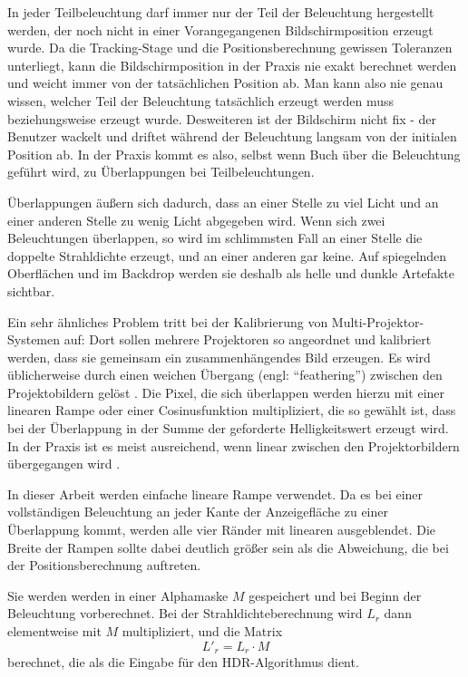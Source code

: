    In jeder Teilbeleuchtung  darf immer nur der Teil der Beleuchtung hergestellt werden, der noch nicht in einer Vorangegangenen Bildschirmposition erzeugt wurde.
   Da die Tracking-Stage und die Positionsberechnung gewissen Toleranzen unterliegt, kann die Bildschirmposition in der Praxis nie exakt berechnet werden und weicht immer von der tatsächlichen Position ab.
   Man kann also nie genau wissen, welcher Teil der Beleuchtung tatsächlich erzeugt werden muss beziehungsweise erzeugt wurde.
   Desweiteren ist der Bildschirm nicht fix - der Benutzer wackelt und driftet während der Beleuchtung langsam von der initialen Position ab. 
   In der Praxis kommt es also, selbst wenn Buch über die Beleuchtung geführt wird, zu Überlappungen bei Teilbeleuchtungen.
   
   Überlappungen äußern sich dadurch, dass an einer Stelle zu viel Licht und an einer anderen Stelle zu wenig Licht abgegeben wird.   
   Wenn sich zwei Beleuchtungen überlappen, so wird im schlimmsten Fall an einer Stelle die doppelte Strahldichte erzeugt, und an einer anderen gar keine. 
   Auf spiegelnden Oberflächen und im Backdrop werden sie deshalb als helle und dunkle Artefakte sichtbar.

   Ein sehr ähnliches Problem tritt bei der Kalibrierung von Multi-Projektor-Systemen auf: Dort sollen mehrere Projektoren so angeordnet und kalibriert werden, dass sie gemeinsam ein zusammenhängendes Bild erzeugen.
   Es wird üblicherweise durch einen weichen Übergang (engl: ``feathering'') zwischen den Projektobildern gelöst \cite{Raskar_1999}.
   Die Pixel, die sich überlappen werden hierzu mit einer linearen Rampe oder einer Cosinusfunktion multipliziert, die so gewählt ist, dass bei der Überlappung in der Summe der geforderte Helligkeitswert erzeugt wird.
   In der Praxis ist es meist ausreichend, wenn linear zwischen den Projektorbildern übergegangen wird  \cite{Raskar_1999}.

   In dieser Arbeit werden einfache lineare Rampe verwendet.
   Da es bei einer vollständigen Beleuchtung an jeder Kante der Anzeigefläche zu einer Überlappung kommt, werden alle vier Ränder mit linearen ausgeblendet.
   Die Breite der Rampen  sollte dabei deutlich größer sein als die Abweichung, die bei der Positionsberechnung auftreten.
   
   Sie werden werden in einer Alphamaske $M$  gespeichert und bei Beginn der Beleuchtung vorberechnet.
   Bei der Strahldichteberechnung wird  $L_r$ dann elementweise mit $M$ multipliziert, und die Matrix 
   \begin{equation}
      L'_r = L_r \cdot M
   \end{equation} 
   berechnet, die als die Eingabe für den HDR-Algorithmus dient.

